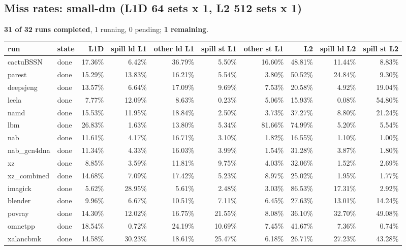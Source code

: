 \documentclass[10pt,a4paper,landscape]{article}
\begin{document}
\subsection*{Miss rates: small-dm (L1D 64 sets x 1, L2 512 sets x 1)}
\textbf{31 of 32 runs completed}, 1 running, 0 pending; \textbf{1 remaining}.\par
{\footnotesize
\begin{longtable}{llrrrrrrrr}
\toprule
run & state & L1D & spill ld L1 & other ld L1 & spill st L1 & other st L1 & L2 & spill ld L2 & spill st L2 \\
\midrule
\endhead
\bottomrule
\endfoot
cactuBSSN & done & 17.36\% & 6.42\% & 36.79\% & 5.50\% & 16.60\% & 48.81\% & 11.44\% & 8.83\% \\
parest & done & 15.29\% & 13.83\% & 16.21\% & 5.54\% & 3.80\% & 50.52\% & 24.84\% & 9.30\% \\
deepsjeng & done & 13.57\% & 6.64\% & 17.09\% & 9.69\% & 7.53\% & 20.58\% & 4.92\% & 19.04\% \\
leela & done & 7.77\% & 12.09\% & 8.63\% & 0.23\% & 5.06\% & 15.93\% & 0.08\% & 54.80\% \\
namd & done & 15.53\% & 11.95\% & 18.84\% & 2.50\% & 3.73\% & 37.27\% & 8.80\% & 21.24\% \\
lbm & done & 26.83\% & 1.63\% & 13.80\% & 5.34\% & 81.66\% & 74.99\% & 5.20\% & 5.54\% \\
nab & done & 11.61\% & 4.17\% & 16.71\% & 3.10\% & 1.82\% & 16.55\% & 1.10\% & 1.00\% \\
nab\_gcn4dna & done & 11.34\% & 4.33\% & 16.03\% & 3.99\% & 1.54\% & 31.28\% & 3.87\% & 1.80\% \\
xz & done & 8.85\% & 3.59\% & 11.81\% & 9.75\% & 4.03\% & 32.06\% & 1.52\% & 2.69\% \\
xz\_combined & done & 14.68\% & 7.09\% & 17.42\% & 5.23\% & 8.97\% & 25.02\% & 1.95\% & 1.77\% \\
imagick & done & 5.62\% & 28.95\% & 5.61\% & 2.48\% & 3.03\% & 86.53\% & 17.31\% & 2.92\% \\
blender & done & 9.96\% & 6.67\% & 10.51\% & 7.11\% & 6.45\% & 27.63\% & 13.01\% & 14.24\% \\
povray & done & 14.30\% & 12.02\% & 16.75\% & 21.55\% & 8.08\% & 36.10\% & 32.70\% & 49.08\% \\
omnetpp & done & 18.54\% & 0.72\% & 24.19\% & 10.69\% & 7.45\% & 41.67\% & 7.36\% & 0.74\% \\
xalancbmk & done & 14.58\% & 30.23\% & 18.61\% & 25.47\% & 6.18\% & 26.71\% & 27.23\% & 43.28\% \\

\end{longtable}}
\end{document}
